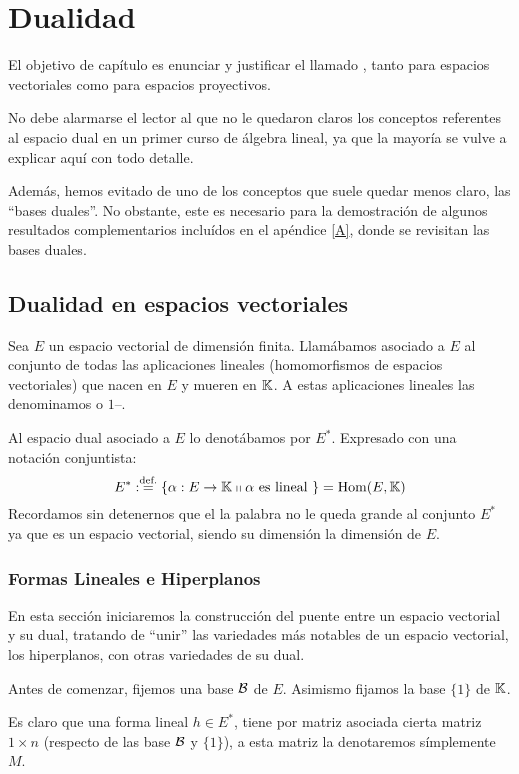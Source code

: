 \chapter{Dualidad}
\label{C2}
El objetivo de capítulo es enunciar y justificar el llamado , tanto para espacios vectoriales como para espacios proyectivos.

No debe alarmarse el lector al que no le quedaron claros los conceptos referentes al espacio dual en un primer curso de álgebra lineal, ya que la mayoría se vulve a explicar aquí con todo detalle.

Además, hemos evitado de uno de los conceptos que suele quedar menos claro, las ``bases duales''. No obstante, este es necesario para la demostración de algunos resultados complementarios incluídos en el apéndice \ref{A}, donde se revisitan las bases duales.
\section{Dualidad en espacios vectoriales}
\label{C2_dualidadVectoriales}
Sea $E$ un espacio vectorial de dimensión finita. Llamábamos  asociado a $E$ al conjunto de todas las aplicaciones lineales (homomorfismos de espacios vectoriales) que nacen en $E$ y mueren en $\mathbb{K}$. A estas aplicaciones lineales las denominamos  o $1$--.

Al espacio dual asociado a $E$ lo denotábamos por $E^*$. Expresado con una notación conjuntista:
\begin{equation}
	\label{C2_eq_defDual}
	E^*:\stackrel{\textrm{def.}}{=}\{\alpha:E\rightarrow \mathbb{K}\shortparallel \alpha \text{ es lineal }\}=\mathrm{Hom}(E,\mathbb{K})
\end{equation}
Recordamos sin detenernos que el la palabra  no le queda grande al conjunto $E^*$ ya que es un espacio vectorial, siendo su dimensión la dimensión de $E$.
\subsection{Formas Lineales e Hiperplanos}
En esta sección iniciaremos la construcción del puente entre un espacio vectorial y su dual, tratando de ``unir'' las variedades más notables de un espacio vectorial, los hiperplanos, con otras variedades de su dual.
 
Antes de comenzar, fijemos una base $\mathcal{B}$ de $E$. Asimismo fijamos la base $\{1\}$ de $\mathbb{K}$.

Es claro que una forma lineal $h\in E^*$, tiene por matriz asociada cierta matriz $1\times n$ (respecto de las base $\mathcal{B}$ y $\{1\}$), a esta matriz la  denotaremos símplemente $M$.

